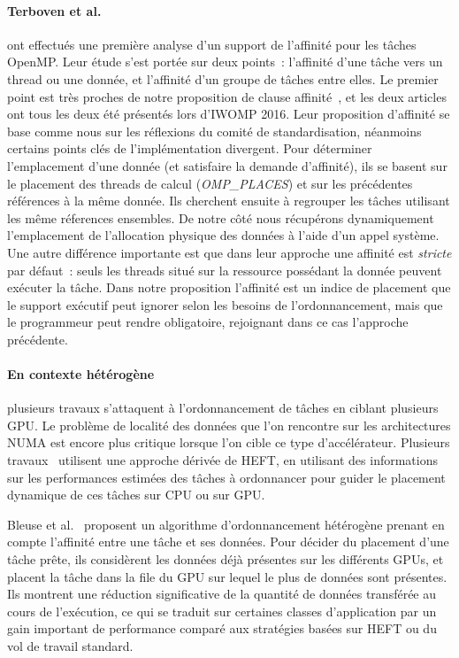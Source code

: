 \paragraph{Terboven et al.~\cite{Terboven2016}} ont effectués une première analyse d'un support de l'affinité pour les tâches OpenMP.
Leur étude s'est portée sur deux points~: l'affinité d'une tâche vers un thread ou une donnée, et l'affinité d'un groupe de tâches entre elles.
Le premier point est très proches de notre proposition de clause affinité~\cite{Virouleau2016b}, et les deux articles ont tous les deux été présentés lors d'IWOMP 2016.
Leur proposition d'affinité se base comme nous sur les réflexions du comité de standardisation, néanmoins certains points clés de l'implémentation divergent.
Pour déterminer l'emplacement d'une donnée (et satisfaire la demande d'affinité), ils se basent sur le placement des threads de calcul (\emph{OMP\_PLACES}) et sur les précédentes références à la même donnée. Ils cherchent ensuite à regrouper les tâches utilisant les même réferences ensembles.
De notre côté nous récupérons dynamiquement l'emplacement de l'allocation physique des données à l'aide d'un appel système.
Une autre différence importante est que dans leur approche une affinité est \emph{stricte} par défaut~: seuls les threads situé sur la ressource possédant la donnée peuvent exécuter la tâche.
Dans notre proposition l'affinité est un indice de placement que le support exécutif peut ignorer selon les besoins de l'ordonnancement, mais que le programmeur peut rendre obligatoire, rejoignant dans ce cas l'approche précédente.


\paragraph{En contexte hétérogène} plusieurs travaux s'attaquent à l'ordonnancement de tâches en ciblant plusieurs GPU.
Le problème de localité des données que l'on rencontre sur les architectures NUMA est encore plus critique lorsque l'on cible ce type d'accélérateur.
Plusieurs travaux~\cite{Hermann2010,Lima2015, StarPU} utilisent une approche dérivée de HEFT, en utilisant des informations sur les performances estimées des tâches à ordonnancer pour guider le placement dynamique de ces tâches sur CPU ou sur GPU.

Bleuse et al.~\cite{Bleuse2014} proposent un algorithme d'ordonnancement hétérogène prenant en compte l'affinité entre une tâche et ses données.
Pour décider du placement d'une tâche prête, ils considèrent les données déjà présentes sur les différents GPUs, et placent la tâche dans la file du GPU sur lequel le plus de données sont présentes.
Ils montrent une réduction significative de la quantité de données transférée au cours de l'exécution, ce qui se traduit sur certaines classes d'application par un gain important de performance comparé aux stratégies basées sur HEFT ou du vol de travail standard.



